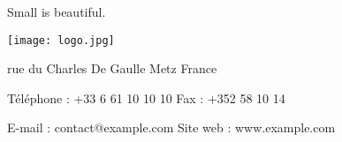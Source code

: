 \documentclass{article}
\begin{document}
Small is beautiful.

\texttt{[image: logo.jpg]}


\begin{multicols}{3}
     rue du Charles De Gaulle Metz\newline
    France\columnbreak

    \noindent
    Téléphone : +33 6 61 10 10 10\newline
    Fax : +352 58 10 14\columnbreak

    \noindent
    E-mail : contact@example.com\newline
    Site web : www.example.com
\end{multicols}
\end{document}
